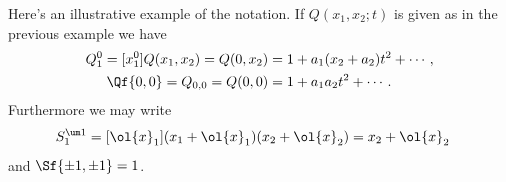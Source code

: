 \begin{example}Here's an illustrative example of the notation. If $Q(x_1,x_2;t)$ is given as in the previous example we have
\begin{align}
	Q_1^0 = [x_1^0]Q(x_1,x_2) = Q(0,x_2) &= 1 + a_1(x_2+a_2)t^2+\cdots\,,\\
	\Qf{0,0} = Q_{0,0} = Q(0,0) &= 1 + a_1a_2 t^2+\cdots\,.
\end{align}
Furthermore we may write
\begin{align}
	S_1^{\um 1} &= [\ol{x}_1](x_1+\ol{x}_1)(x_2+\ol{x}_2) = x_2+\ol{x}_2
\end{align}
and $\Sf{\pm 1,\pm1}  = 1$.
\end{example}

\endinput


\begin{align}
\end{align}

\begin{example}
\end{example}

\begin{theorem}
\end{theorem}

\begin{corollary}
\end{corollary}

\begin{definition}
\end{definition}

\begin{lemma}
\end{lemma}

\begin{prop}
\end{prop}

\begin{proof}
\end{proof}
